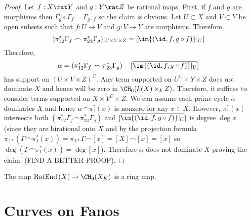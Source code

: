 \documentclass[12pt]{article}
\begin{document}
\begin{proof}
Let $f : X \rat Y$ and $g : Y \rat Z$ be rational maps. First, if $f$ and $g$ are morphisms then $\Gamma_g \circ \Gamma_f = \Gamma_{g \circ f}$ so the claim is obvious. Let $U \subset X$ and $V \subset Y$ be open subsets such that $f : U \to V$ and $g : V \to Y$ are morphisms. Therefore,
\[ (\pi_{12}^* \Gamma_f \frown \pi_{23}^* \Gamma_g)|_{U \times V \times Z} = [\im{(\id, f, g \circ f)}|_{U}] \]
Therefore, 
\[ \alpha = (\pi_{12}^* \Gamma_f \frown \pi_{23}^* \Gamma_g) - [\overline{\im{(\id, f, g \circ f)}|_{U}}] \]
has support on $(U \times V \times Z)^C$. Any term supported on $U^C \times Y \times Z$ does not dominate $X$ and hence will be zero in $\CH_0(k(X) \times_k Z)$. Therefore, it suffices to consider terms supported on $X \times V^C \times Z$. We can assume each prime cycle $\alpha$ dominates $X$ and hence $\alpha \frown \pi_{1}^*(x)$ is nonzero for any $x \in X$. However, $\pi_1^*(x)$ intersects both $(\pi_{12}^* \Gamma_f \frown \pi_{23}^* \Gamma_g)$ and $[\overline{\im{(\id, f, g \circ f)}|_{U}}]$ is degree $\deg{x}$ (since they are birational onto $X$ and by the projection formula $\pi_{1*}(\Gamma \frown \pi_{1}^*(x)) = \pi_{1*} \Gamma \frown [x] = [X] \frown [x] = [x]$ so $\deg{(\Gamma \frown \pi_{1}^*(x))} = \deg{[x]}$). Therefore $\alpha$ does not dominate $X$ proving the claim. (FIND A BETTER PROOF).
\end{proof}

\newcommand{\RatEnd}[1]{\mathrm{RatEnd}\left( #1 \right)}

\begin{cor}
The map $\RatEnd{X} \to \CH_0(X_K)$ is a ring map. 
\end{cor}


\section{Curves on Fanos}

\newcommand{\Def}[1]{\mathrm{Def}\left( #1 \right)}
\newcommand{\Ob}[1]{\mathrm{Ob}\left( #1 \right)}
\newcommand{\ob}{\mathrm{ob}}
\end{document}
